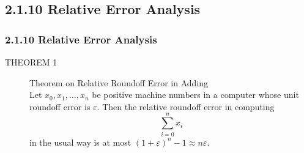 \documentclass[notheorems,mathserif,table,compress]{beamer}  %
\begin{document}
\subsection{2.1.10 Relative Error Analysis}

\begin{frame}
  \frametitle{2.1.10 Relative Error Analysis}
  \begin{description}
  \item[THEOREM 1] \textsf{Theorem on Relative Roundoff Error in Adding}\\
  Let $x_0,x_1,\ldots,x_n$ be positive machine numbers in a computer whose unit roundoff error is $\varepsilon$. Then the relative roundoff error in computing 
  \[ \sum_{i=0}^n x_i \]
  in the usual way is at most $(1+\varepsilon)^n-1 \approx n\varepsilon$.
  \end{description}
\end{frame}
\end{document}
